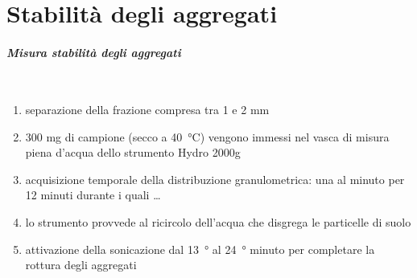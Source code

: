 \part{Stabilit\`a degli aggregati}
\begin{frame}
  \frametitle{Misura stabilit\`a degli aggregati}
  \begin{columns}
    \pause
    \begin{enumerate}[<+->] 
    \item separazione della frazione compresa tra 1 e 2 mm  
    \item 300 mg di campione (secco a \SI{40}{\celsius}) vengono immessi
      nel vasca di misura piena d'acqua dello strumento Hydro 2000g
    \item acquisizione temporale della distribuzione granulometrica:
      una al minuto per 12 minuti durante i quali \ldots
    \item lo strumento provvede al ricircolo dell'acqua che disgrega
      le particelle di suolo
    \item attivazione della sonicazione dal \SI{13}{\degree} al
      \SI{24}{\degree} minuto per completare la rottura degli
      aggregati
      

\end{enumerate}
\end{columns}
\end{frame}
